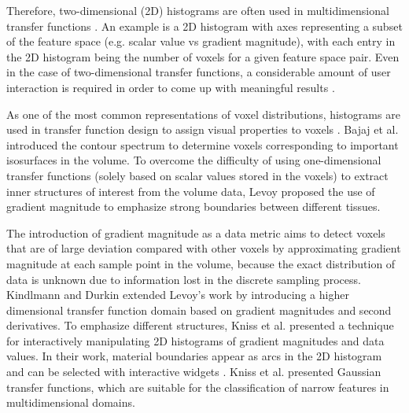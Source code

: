 Therefore, two-dimensional (2D) histograms are often used in multidimensional transfer functions \cite{maciejewski_structuring_2009}. An example is a 2D histogram with axes representing a subset of the feature space (e.g. scalar value vs gradient magnitude), with each entry in the 2D histogram being the number of voxels for a given feature space pair.
Even in the case of two-dimensional transfer functions, a considerable amount of user interaction is required in order to come up with meaningful results \cite{arens_survey_2010}.

As one of the most common representations of voxel distributions, histograms are used in transfer function design to assign visual properties to voxels \cite{pfister_transfer_2001}. Bajaj et al. \cite{bajaj_contour_1997} introduced the contour spectrum to determine voxels corresponding to important isosurfaces in the volume. To overcome the difficulty of using one-dimensional transfer functions (solely based on scalar values stored in the voxels) to extract inner structures of interest from the volume data, Levoy \cite{levoy_display_1988} proposed the use of gradient magnitude to emphasize strong boundaries between different tissues.

The introduction of gradient magnitude as a data metric aims to detect voxels that are of large deviation compared with other voxels by approximating gradient magnitude at each sample point in the volume, because the exact distribution of data is unknown due to information lost in the discrete sampling process.
Kindlmann and Durkin \cite{kindlmann_semi-automatic_1998} extended Levoy's work \cite{levoy_display_1988} by introducing a higher dimensional transfer function domain based on gradient magnitudes and second derivatives. To emphasize different structures, Kniss et al. \cite{kniss_interactive_2001} presented a technique for interactively manipulating 2D histograms of gradient magnitudes and data values. In their work, material boundaries appear as arcs in the 2D histogram and can be selected with interactive widgets \cite{kniss_multidimensional_2002}.
Kniss et al. \cite{kniss_gaussian_2003} presented Gaussian transfer functions, which are suitable for the classification of narrow features in multidimensional domains.

